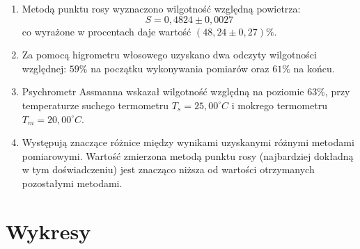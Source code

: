 \documentclass[a4paper,12pt]{article}
\begin{document}
\begin{enumerate}
    \item Metodą punktu rosy wyznaczono wilgotność względną powietrza:
          \begin{equation}
              S = 0{,}4824 \pm 0{,}0027
          \end{equation}
          co wyrażone w procentach daje wartość $(48{,}24 \pm 0{,}27)\%$.

    \item Za pomocą higrometru włosowego uzyskano dwa odczyty wilgotności względnej: $59\%$ na początku wykonywania pomiarów oraz $61\%$ na końcu.

    \item Psychrometr Assmanna wskazał wilgotność względną na poziomie $63\%$, przy temperaturze suchego termometru $T_s = 25{,}00^\circ C$ i mokrego termometru $T_m = 20{,}00^\circ C$.

    \item Występują znaczące różnice między wynikami uzyskanymi różnymi metodami pomiarowymi. Wartość zmierzona metodą punktu rosy (najbardziej dokładną w tym doświadczeniu) jest znacząco niższa od wartości otrzymanych pozostałymi metodami.

\end{enumerate}

\section{Wykresy}



\end{document}
